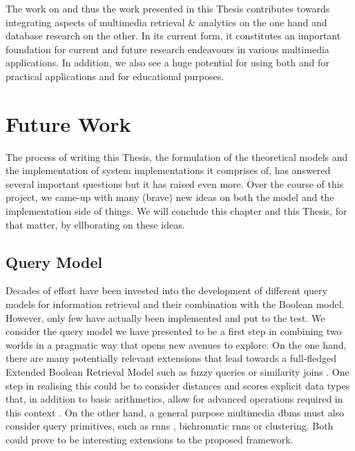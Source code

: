 The work on \cottontail{} and thus the work presented in this Thesis contributes towards integrating aspects of multimedia retrieval \& analytics on the one hand and database research on the other. In its current form, it constitutes an important foundation for current and future research endeavours in various multimedia applications. In addition, we also see a huge potential for using both \vitrivr{} and \cottontail{} for practical applications and for educational purposes.

\section{Future Work}

The process of writing this Thesis, the formulation of the theoretical models and the implementation of system implementations it comprises of, has answered several important questions but it has raised even more. Over the course of this project, we came-up with many (brave) new ideas on both the model and the implementation side of things. We will conclude this chapter and this Thesis, for that matter, by ellborating on these ideas.

\subsection{Query Model}

Decades of effort have been invested into the development of different query models for information retrieval and their combination with the Boolean model. However, only few have actually been implemented and put to the test. We consider the query model we have presented to be a first step in combining two worlds in a pragmatic way that opens new avenues to explore. On the one hand, there are many potentially relevant extensions that lead towards a full-fledged Extended Boolean Retrieval Model \cite{Salton:1983Extended} such as fuzzy queries \cite{Umano:1983Retrieval,Bohm:2001Fast} or similarity joins \cite{Yao:2010K}. One step in realising this could be to consider distances and scores explicit data types that, in addition to basic arithmetics, allow for advanced operations required in this context \cite{Silva:2010SimDB}. On the other hand, a general purpose multimedia \acrshort{dbms} must also consider query primitives, such as \acrshort{rnns} \cite{Korn:2000Influence}, bichromatic \acrshort{rnns} \cite{Stanoi:2001Discovery} or clustering. Both could prove to be interesting extensions to the proposed framework.

